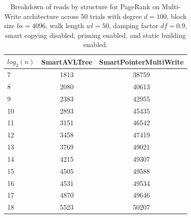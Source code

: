 \begin{table}[]
\centering
\begin{tabular}{|l|c|c|}
$log_2(n)$ & SmartAVLTree & SmartPointerMultiWrite \\ \hline
7 & 1813 & 38759 \\ \hline
8 & 2080 & 40613 \\ \hline
9 & 2383 & 42955 \\ \hline
10 & 2893 & 45435 \\ \hline
11 & 3151 & 46542 \\ \hline
12 & 3458 & 47419 \\ \hline
13 & 3769 & 49021 \\ \hline
14 & 4215 & 49307 \\ \hline
15 & 4505 & 49588 \\ \hline
16 & 4531 & 49534 \\ \hline
17 & 4870 & 49646 \\ \hline
18 & 5523 & 50207 \\ \hline
\end{tabular}
\caption{Breakdown of reads by structure for PageRank on Multi-Write architecture across 50 trials with degree $d=100$, block size $bs=4096$, walk length $wl=50$, damping factor $df=0.9$, smart copying disabled, priming enabled, and static building enabled.}
    \label{tab:reads_by_structure_pr_d100_bs4096_trials50_copiesfalse_primetrue_staticinsertiontrue_wl50_df0.9_ptmultiwrite_movetrue}
\end{table}

